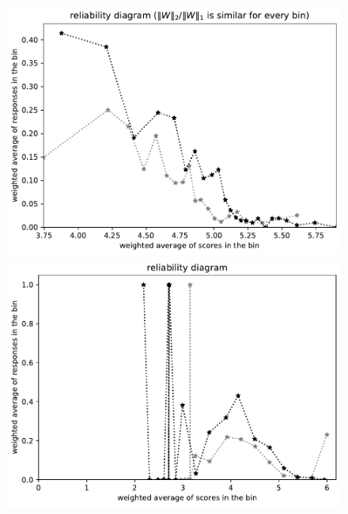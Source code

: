 \documentclass{article}
\newlength{\vertsep}
\newlength{\imsize}
\begin{document}
\begin{figure}
\begin{centering}
\parbox{\imsize}{\includegraphics[width=\imsize]
{../codes/weighted/County_of_San_Francisco_vs_San_Joaquin-LNGI/equierrs20.pdf}}
\quad\quad
\parbox{\imsize}{\includegraphics[width=\imsize]
{../codes/weighted/County_of_San_Francisco_vs_San_Joaquin-LNGI/equiscores20.pdf}}

\vspace{\vertsep}


\end{centering}
\end{figure}
\end{document}
